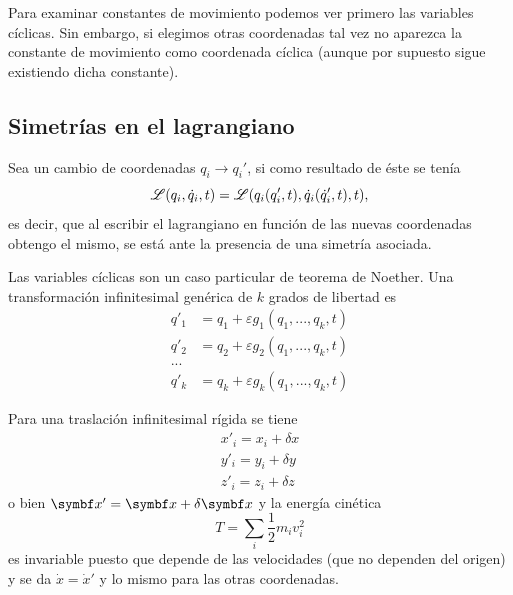 \documentclass[10pt,oneside]{CBFT_book}
\begin{document}

Para examinar constantes de movimiento podemos ver primero las variables cíclicas. Sin embargo, si elegimos otras 
coordenadas tal vez no aparezca la constante de movimiento como coordenada cíclica (aunque por supuesto sigue 
existiendo dicha constante).

\subsection{Simetrías en el lagrangiano}

Sea un cambio de coordenadas $q_i \to q_i'$, si como resultado de éste se tenía
\[
	\mathscr{L}(q_i, \dot{q}_i, t ) = \mathscr{L}(q_i(q_i',t), \dot{q}_i(\dot{q}_i',t), t ),
\]
es decir, que al escribir el lagrangiano en función de las nuevas coordenadas obtengo el mismo, se está ante la 
presencia de una simetría asociada.

Las variables cíclicas son un caso particular de teorema de Noether. Una transformación infinitesimal genérica de $k$ 
grados de libertad es
\begin{eqnarray*}
	q'_1 &= q_1 + \varepsilon g_1(q_1,...,q_k,t) \\
	q'_2 &= q_2 + \varepsilon g_2(q_1,...,q_k,t) \\
	... \\
	q'_k &= q_k + \varepsilon g_k(q_1,...,q_k,t)
\end{eqnarray*}

Para una traslación infinitesimal rígida se tiene 
\begin{eqnarray*}
	x'_i = x_i + \delta x \\
	y'_i = y_i + \delta y \\
	z'_i = z_i + \delta z
\end{eqnarray*}
o bien $\vb{x}' = \vb{x} + \delta \vb{x}$ y la energía cinética 
\[
	T = \sum_i \frac{1}{2} m_i v_i^2
\]
es invariable puesto que depende de las velocidades (que no dependen del origen) y se da $\dot{x} = \dot{x}'$ y lo 
mismo para las otras coordenadas.
\end{document}
